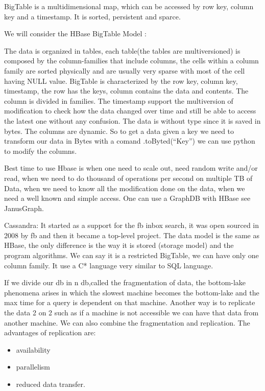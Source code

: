 \documentclass[a4page, 11pt]{article}
\begin{document}
BigTable is a multidimensional map, which can be accessed by row key,
column key and a timestamp. It is sorted, persistent and sparce.

We will consider the HBase BigTable Model :

The data is organized in tables, each table(the tables are
multiversioned) is composed by the column-families that include columns,
the cells within a column family are sorted physically and are usually
very sparse with most of the cell having NULL value. BigTable is
characterized by the row key, column key, timestamp, the row has the
keys, column contains the data and contents. The column is divided in
families. The timestamp support the multiversion of modification to
check how the data changed over time and still be able to access the
latest one without any confusion. The data is without type since it is
saved in bytes. The columns are dynamic. So to get a data given a key we
need to transform our data in Bytes with a comand .toByted(``Key'') we
can use python to modify the columns.

Best time to use Hbase is when one need to scale out, need random write
and/or read, when we need to do thousand of operations per second on
multiple TB of Data, when we need to know all the modification done on
the data, when we need a well known and simple access. One can use a
GraphDB with HBase see JanusGraph.

Cassandra: It started as a support for the fb inbox search, it was open sourced in 2008 by fb and then it became a top-level project. The data model is the same as HBase, the only difference is the way it is stored (storage model) and the program algorithms. We can say it is a restricted BigTable, we can have only one column family. It use a C* language very similar to SQL language.

If we divide our db in n db,called the fragmentation of data, the
bottom-lake phenomena arises in which the slowest machine becomes the bottom-lake and the max time for a query is dependent on that machine. Another way is to replicate the data 2 on 2 such as if a machine is not accessible we can have that data from another machine. We can also combine the fragmentation and replication.
The advantages of replication are:
\begin{itemize}[noitemsep]
	\item
	availability
	\item
	parallelism
	\item
	reduced data transfer.
\end{itemize}
\end{document}
